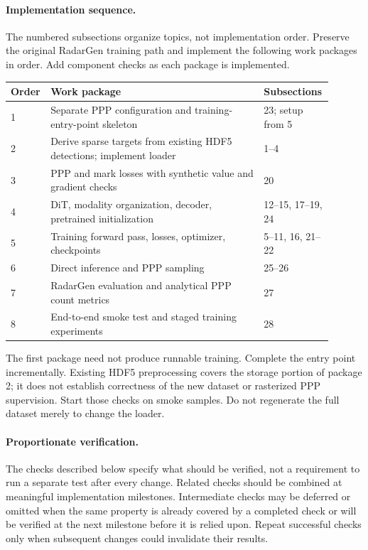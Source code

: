 \documentclass[11pt,a4paper]{article}
\begin{document}
\paragraph{Implementation sequence.}
The numbered subsections organize topics, not implementation order. Preserve the original RadarGen training path and implement the following work packages in order. Add component checks as each package is implemented.
\begin{center}
\begin{tabular}{p{0.06\linewidth}p{0.65\linewidth}p{0.19\linewidth}}
\hline
Order & Work package & Subsections \\
\hline
1 & Separate PPP configuration and training-entry-point skeleton & 23; setup from 5 \\
2 & Derive sparse targets from existing HDF5 detections; implement loader & 1--4 \\
3 & PPP and mark losses with synthetic value and gradient checks & 20 \\
4 & DiT, modality organization, decoder, pretrained initialization & 12--15, 17--19, 24 \\
5 & Training forward pass, losses, optimizer, checkpoints & 5--11, 16, 21--22 \\
6 & Direct inference and PPP sampling & 25--26 \\
7 & RadarGen evaluation and analytical PPP count metrics & 27 \\
8 & End-to-end smoke test and staged training experiments & 28 \\
\hline
\end{tabular}
\end{center}
The first package need not produce runnable training. Complete the entry point incrementally. Existing HDF5 preprocessing covers the storage portion of package 2; it does not establish correctness of the new dataset or rasterized PPP supervision. Start those checks on smoke samples. Do not regenerate the full dataset merely to change the loader.

\paragraph{Proportionate verification.}
The checks described below specify what should be verified,
not a requirement to run a separate test after every change.
Related checks should be combined at meaningful implementation
milestones. Intermediate checks may be deferred or omitted when
the same property is already covered by a completed check or
will be verified at the next milestone before it is relied upon.
Repeat successful checks only when subsequent changes could
invalidate their results.
\end{document}
